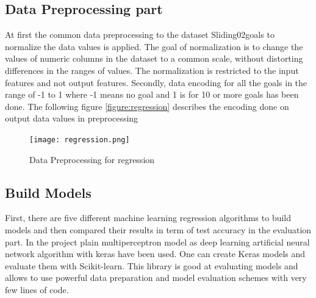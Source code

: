 \subsection{Data Preprocessing part}
At first the common data preprocessing to the dataset Sliding02goals to normalize the data values is applied.\newline
The goal of normalization is to change the values of numeric columns in the dataset to a common scale, without distorting differences in the ranges of values. The normalization is restricted to the input features and not output features.\newline
Secondly, data encoding for all the goals in the range of -1 to 1 where -1 means no goal and 1 is for 10 or more goals has been done. 
The following figure \autoref{figure:regression} describes the encoding done on output data values in preprocessing
\begin{figure}[H]
\begin{center}
\texttt{[image: regression.png]}
\end{center}
\caption{Data Preprocessing for regression }
\label{figure:regression}
\end{figure}
\subsection{Build Models }
First, there are five different machine learning regression algorithms to build models and then compared their results in term of test accuracy in the evaluation part.\newline \newline
In the project plain multiperceptron model as deep learning artificial neural network algorithm with keras have been used. One can create Keras models and evaluate them with Scikit-learn. This library is good at evaluating models and allows to use powerful data preparation and model evaluation schemes with very few lines of code.
